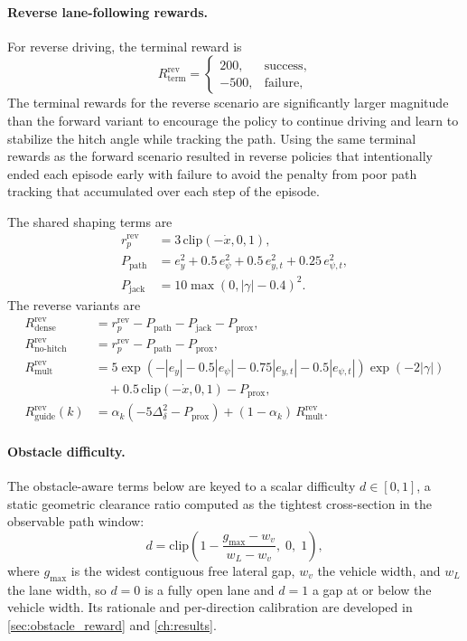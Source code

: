 \paragraph{Reverse lane-following rewards.}
For reverse driving, the terminal reward is
\begin{equation}
R_{\mathrm{term}}^{\mathrm{rev}} =
\begin{cases}
200, & \text{success}, \\
-500, & \text{failure},
\end{cases}
\end{equation}
The terminal rewards for the reverse scenario are significantly larger magnitude than the forward variant to encourage the policy to continue driving and learn to stabilize the hitch angle while tracking the path. Using the same terminal rewards as the forward scenario resulted in reverse policies that intentionally ended each episode early with failure to avoid the penalty from poor path tracking that accumulated over each step of the episode.

The shared shaping terms are
\begin{align}
r_p^{\mathrm{rev}} &= 3\,\mathrm{clip}(-\dot{x}, 0, 1), \\
P_{\mathrm{path}} &= e_y^2 + 0.5\,e_\psi^2 + 0.5\,e_{y,t}^2 + 0.25\,e_{\psi,t}^2,
\\
P_{\mathrm{jack}} &= 10\max(0, |\gamma| - 0.4)^2.
\end{align}
The reverse variants are
\begin{align}
R_{\mathrm{dense}}^{\mathrm{rev}} &= r_p^{\mathrm{rev}} - P_{\mathrm{path}} - P_{\mathrm{jack}} - P_{\mathrm{prox}},
\\
R_{\mathrm{no\mbox{-}hitch}}^{\mathrm{rev}} &= r_p^{\mathrm{rev}} - P_{\mathrm{path}} - P_{\mathrm{prox}},
\\
R_{\mathrm{mult}}^{\mathrm{rev}} &= 5\exp\!\left(-|e_y|-0.5|e_\psi|-0.75|e_{y,t}|-0.5|e_{\psi,t}|\right)\exp\!\left(-2|\gamma|\right) \nonumber\\
&\quad + 0.5\,\mathrm{clip}(-\dot{x}, 0, 1) - P_{\mathrm{prox}},
\\
R_{\mathrm{guide}}^{\mathrm{rev}}(k) &= \alpha_k
\left(-5\Delta_\delta^2 - P_{\mathrm{prox}}\right)
+ (1-\alpha_k)\,R_{\mathrm{mult}}^{\mathrm{rev}}.
\end{align}

\paragraph{Obstacle difficulty.}
The obstacle-aware terms below are keyed to a scalar difficulty $d \in [0,1]$, a
static geometric clearance ratio computed as the tightest cross-section in the observable path window:
\begin{equation}
d = \mathrm{clip}\!\left(1 - \frac{g_{\max} - w_v}{w_L - w_v},\; 0,\; 1\right),
\label{eq:obstacle_difficulty}
\end{equation}
where $g_{\max}$ is the widest contiguous free lateral gap, $w_v$ the vehicle width, and
$w_L$ the lane width, so $d=0$ is a fully open lane and $d=1$ a gap at or below the vehicle
width. Its rationale and per-direction calibration are developed in \cref{sec:obstacle_reward}
and \cref{ch:results}.

